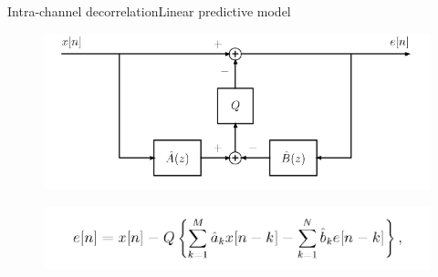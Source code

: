 \documentclass{beamer}
\begin{document}
\begin{frame}{Intra-channel decorrelation}{Linear predictive model}
	\begin{figure}
		\includegraphics[scale=0.42]{response.png}
	\end{figure}
	\begin{figure}
		\includegraphics[scale=0.42]{formula.png}
	\end{figure}
\end{frame}
\end{document}
